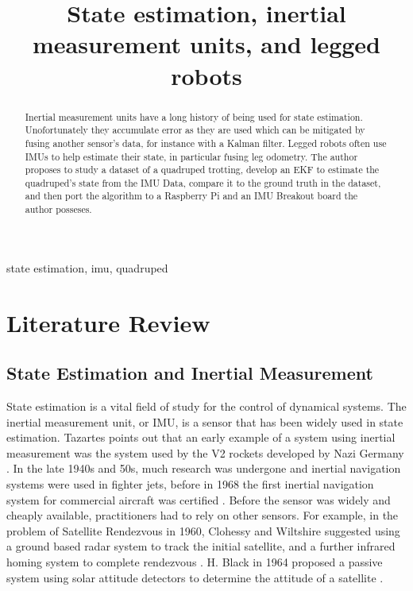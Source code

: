 \documentclass[conference]{IEEEtran}
\begin{document}
\title{State estimation, inertial measurement units, and legged robots\\
}

\author{
}

\maketitle

\begin{abstract}
Inertial measurement units have a long history of being used for state estimation. Unofortunately they accumulate error as they are used which can be mitigated by fusing another sensor's data, for instance with a Kalman filter. Legged robots often use IMUs to help estimate their state, in particular fusing leg odometry. The author proposes to study a dataset of a quadruped trotting, develop an EKF to estimate the quadruped's state from the IMU Data, compare it to the ground truth in the dataset, and then port the algorithm to a Raspberry Pi and an IMU Breakout board the author posseses.
\end{abstract}

\begin{IEEEkeywords}
state estimation, imu, quadruped
\end{IEEEkeywords}

\section{Literature Review}
\subsection{State Estimation and Inertial Measurement}
State estimation is a vital field of study for the control of dynamical systems. The inertial measurement unit, or IMU, is a sensor that has been widely used in state estimation.
Tazartes points out that an early example of a system using inertial measurement was the system used by the V2 rockets developed by Nazi Germany \cite{b1}. In the late 1940s and 50s, much research
was undergone and inertial navigation systems were used in fighter jets, before in 1968 the first inertial navigation system for commercial aircraft was certified \cite{b1}. Before the sensor was widely and cheaply available,
practitioners had to rely on other sensors. For example, in the problem of Satellite Rendezvous in 1960, Clohessy and Wiltshire suggested using a ground based radar system to track the initial satellite,
and a further infrared homing system to complete rendezvous \cite{b2}. H. Black in 1964 proposed a passive system using solar attitude detectors to determine the attitude of a satellite \cite{b3}.
\end{document}
